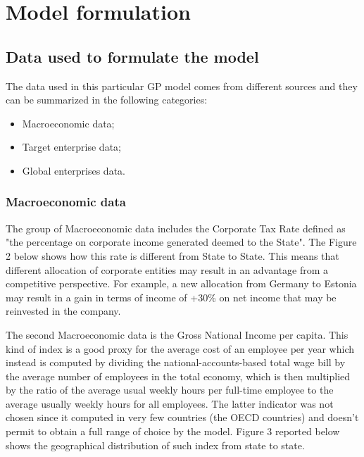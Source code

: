 \documentclass{article}
\begin{document}
\section{Model formulation}

\subsection{Data used to formulate the model}
The data used in this particular GP model comes from different sources and they can be summarized in the following categories:
\begin{itemize}
    \item Macroeconomic data;
    \item Target enterprise data;
    \item Global enterprises data.
\end{itemize}

\subsubsection{Macroeconomic data}
The group of Macroeconomic data includes the Corporate Tax Rate defined as "the percentage on corporate income generated deemed to the State". The Figure 2 below shows how this rate is different from State to State. This means that different allocation of corporate entities may result in an advantage from a competitive perspective. For example, a new allocation from Germany to Estonia may result in a gain in terms of income of +30\% on net income that may be reinvested in the company.

The second Macroeconomic data is the Gross National Income per capita. This kind of index is a good proxy for the average cost of an employee per year which instead is computed by dividing the national-accounts-based total wage bill by the average number of employees in the total economy, which is then multiplied by the ratio of the average usual weekly hours per full-time employee to the average usually weekly hours for all employees. The latter indicator was not chosen since it computed in very few countries (the OECD countries) and doesn't permit to obtain a full range of choice by the model. Figure 3 reported below shows the geographical distribution of such index from state to state.
\end{document}
